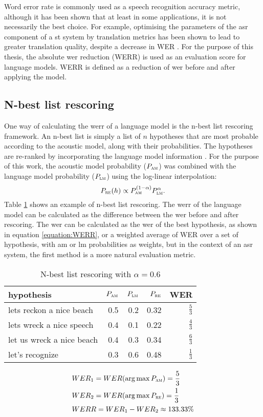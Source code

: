 Word error rate is commonly used as a speech recognition accuracy metric, although it has been shown that at least in some applications, it is not necessarily the best choice. For example, optimising the parameters of the \gls{asr} component of a \gls{st} system by translation metrics has been shown to lead to greater translation quality, despite a decrease in WER \cite{he2011word}. For the purpose of this thesis, the absolute \gls{wer} reduction (WERR) is used as an evaluation score for language models. WERR is defined as a reduction of \gls{wer} before and after applying the model.

	\subsection{N-best list rescoring}
	One way of calculating the \gls{werr} of a language model is the n-best list rescoring framework. An n-best list is simply a list of $n$ hypotheses that are most probable according to the acoustic model, along with their probabilities. The hypotheses are re-ranked by incorporating the language model information \cite{broman2005methods}. For the purpose of this work, the acoustic model probability ($P_{\textsc{am}}$) was combined with the language model probability ($P_{\textsc{lm}}$) using the log-linear interpolation:
	\begin{equation}
		P_{\textsc{re}}(h)\propto P_{\textsc{am}}^{(1-\alpha)}P_{\textsc{lm}}^{\alpha}.
	\end{equation}
	Table \ref{table:nbest} shows an example of n-best list rescoring. The \gls{werr} of the language model can be calculated as the difference between the \gls{wer} before and after rescoring. The \gls{wer} can be calculated as the \gls{wer} of the best hypothesis, as shown in equation \ref{equation:WERR}, or a weighted average of WER over a set of hypothesis, with \gls{am} or \gls{lm} probabilities as weights, but in the context of an \gls{asr} system, the first method is a more natural evaluation metric.

\begin{table}[h!]
  \caption{N-best list rescoring with $\alpha=0.6$}
  \label{table:nbest}
    \centering
    \begin{tabular*}{.6\linewidth}{@{\extracolsep{\fill}}lrrrr}
	    hypothesis & $P_{\textsc{am}}$ & $P_{\textsc{lm}}$ & $P_{\textsc{re}}$ & WER\\
	        \midrule
		lets reckon a nice beach    & 0.5 & 0.2 & 0.32 & $\frac{5}{3}$\\
		lets wreck a nice speech    & 0.4 & 0.1 & 0.22 & $\frac{4}{3}$\\
		let us wreck a nice beach   & 0.4 & 0.3 & 0.34 & $\frac{6}{3}$\\
		let's recognize             & 0.3 & 0.6 & 0.48 & $\frac{1}{3}$\\
    \end{tabular*}
\end{table}

	\begin{align}
		\label{equation:WERR}
		&WER_{1}=WER(\operatorname*{arg\, max}{P_{\textsc{am}}})=\frac{5}{3} \nonumber\\
		&WER_{2}=WER(\operatorname*{arg\, max}{P_{\textsc{re}}})=\frac{1}{3} \nonumber\\
		&WERR =  WER_{1} - WER_{2}\approx133.33\%
	\end{align}

